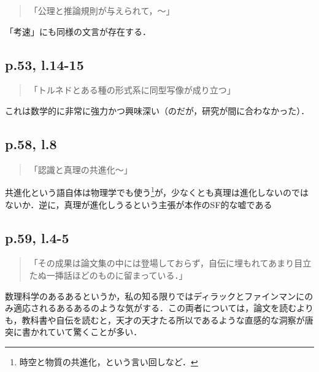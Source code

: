 \documentclass[10pt, a5paper, twoside]{jsarticle}
\theoremstyle{definition}
\begin{document}
                \begin{quote}

                    「公理と推論規則が与えられて，〜」

                \end{quote}

                「考速」にも同様の文言が存在する．

            \subsection{p.53, l.14-15}

                \begin{quote}

                    「トルネドとある種の形式系に同型写像が成り立つ」

                \end{quote}

                これは数学的に非常に強力かつ興味深い（のだが，研究が間に合わなかった）．


            \subsection{p.58, l.8}

                \begin{quote}

                    「認識と真理の共進化〜」

                \end{quote}

                共進化という語自体は物理学でも使う\footnote{時空と物質の共進化，という言い回し\cite{mtb}など．}が，少なくとも真理は進化しないのではないか．逆に，真理が進化しうるという主張が本作のSF的な嘘である

            \subsection{p.59, l.4-5}

                \begin{quote}

                    「その成果は論文集の中には登場しておらず，自伝に埋もれてあまり目立たぬ一挿話ほどのものに留まっている．」

                \end{quote}

                数理科学のあるあるというか，私の知る限りではディラックとファインマンにのみ適応されるあるあるのような気がする．この両者については，論文を読むよりも，教科書\cite{dir, fynp}や自伝\cite{fyna}を読むと，天才の天才たる所以であるような直感的な洞察が唐突に書かれていて驚くことが多い．
\end{document}
